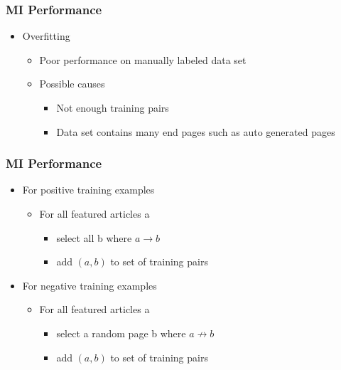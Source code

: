 \begin{frame}
    \frametitle{MI Performance}
    \begin{itemize}
      \item Overfitting
      \begin{itemize}
        \item Poor performance on manually labeled data set
        \item Possible causes 
        \begin{itemize}
          \item Not enough training pairs
          \item Data set contains many end pages such as auto generated pages
        \end{itemize}
      \end{itemize}
    \end{itemize}
\end{frame}


\begin{frame}
    \frametitle{MI Performance}
    \begin{itemize}
      \item For positive training examples
      \begin{itemize}
        \item For all featured articles a
        \begin{itemize}
          \item select all b where $a \rightarrow b$
          \item add $(a,b)$ to set of training pairs
        \end{itemize}
      \end{itemize}
      \item For negative training examples
      \begin{itemize}
        \item For all featured articles a
        \begin{itemize}
          \item select a random page b where $a \not \rightarrow b$
          \item add $(a,b)$ to set of training pairs
        \end{itemize}
      \end{itemize}
    \end{itemize}
\end{frame}

